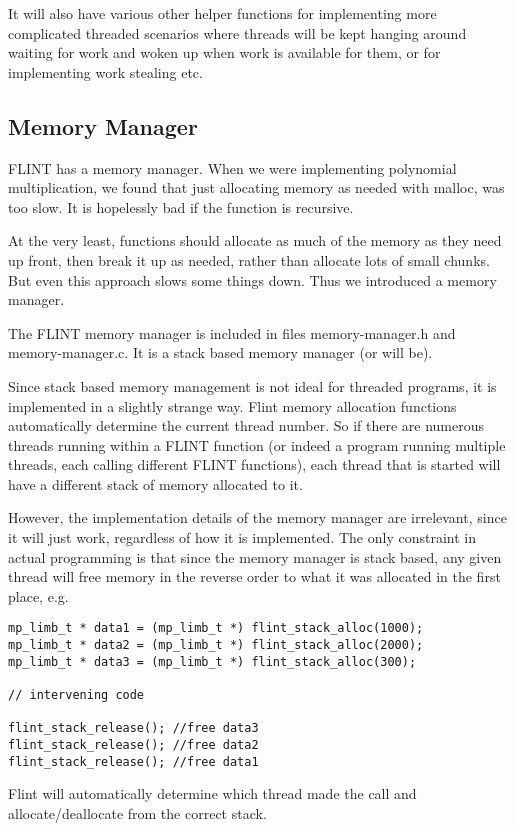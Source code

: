 \documentclass[a4paper,10pt]{article}
\begin{document}
It will also have various other helper functions for implementing more complicated threaded scenarios where threads will be kept hanging around waiting for work and woken up when work is available for them, or for implementing work stealing etc.

\subsection{Memory Manager}
FLINT has a memory manager. When we were implementing polynomial multiplication, we found that just allocating memory as needed with malloc, was too slow. It is hopelessly bad if the function is recursive.

At the very least, functions should allocate as much of the memory as they need up front, then break it up as needed, rather than allocate lots of small chunks. But even this approach slows some things down. Thus we introduced a memory manager.

The FLINT memory manager is included in files memory-manager.h and memory-manager.c. It is a stack based memory manager (or will be). 

Since stack based memory management is not ideal for threaded programs, it is implemented in a slightly strange way. Flint memory allocation functions automatically determine the current thread number. So if there are numerous threads running within a FLINT function (or indeed a program running multiple threads, each calling different FLINT functions), each thread that is started will have a different stack of memory allocated to it. 

However, the implementation details of the memory manager are irrelevant, since it will just work, regardless of how it is implemented. The only constraint in actual programming is that since the memory manager is stack based, any given thread will free memory in the reverse order to what it was allocated in the first place, e.g.

\begin{verbatim}mp_limb_t * data1 = (mp_limb_t *) flint_stack_alloc(1000);
mp_limb_t * data2 = (mp_limb_t *) flint_stack_alloc(2000);
mp_limb_t * data3 = (mp_limb_t *) flint_stack_alloc(300);

// intervening code

flint_stack_release(); //free data3
flint_stack_release(); //free data2
flint_stack_release(); //free data1
\end{verbatim}

Flint will automatically determine which thread made the call and allocate/deallocate from the correct stack.
\end{document}

